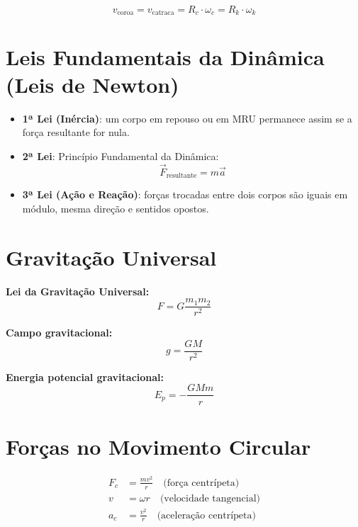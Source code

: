 \documentclass[a4paper,12pt]{article}
\begin{document}
\begin{multicols}{2}
\begin{equation*}
  v_{\text{coroa}} = v_{\text{catraca}} = R_c \cdot \omega_c = R_k \cdot \omega_k
\end{equation*}


\section{Leis Fundamentais da Dinâmica (Leis de Newton)}

\begin{itemize}
  \item \textbf{1ª Lei (Inércia)}: um corpo em repouso ou em MRU permanece assim se a força resultante for nula.
  \item \textbf{2ª Lei}: Princ\'ipio Fundamental da Din\^amica:
  \begin{equation*}
    \vec{F}_{\text{resultante}} = m \vec{a}
  \end{equation*}
  \item \textbf{3ª Lei (Ação e Reação)}: forças trocadas entre dois corpos são iguais em módulo, mesma direção e sentidos opostos.
\end{itemize}

\section{Gravitação Universal}

\textbf{Lei da Gravitação Universal:}
\begin{equation*}
  F = G \frac{m_1 m_2}{r^2}
\end{equation*}

\textbf{Campo gravitacional:}
\begin{equation*}
  g = \frac{G M}{r^2}
\end{equation*}

\textbf{Energia potencial gravitacional:}
\begin{equation*}
  E_p = -\frac{G M m}{r}
\end{equation*}

\section{Forças no Movimento Circular}

\begin{align*}
  F_c &= \frac{m v^2}{r} \quad \text{(força centrípeta)} \\
  v &= \omega r \quad \text{(velocidade tangencial)} \\
  a_c &= \frac{v^2}{r} \quad \text{(aceleração centrípeta)}
\end{align*}


\end{multicols}
\end{document}
